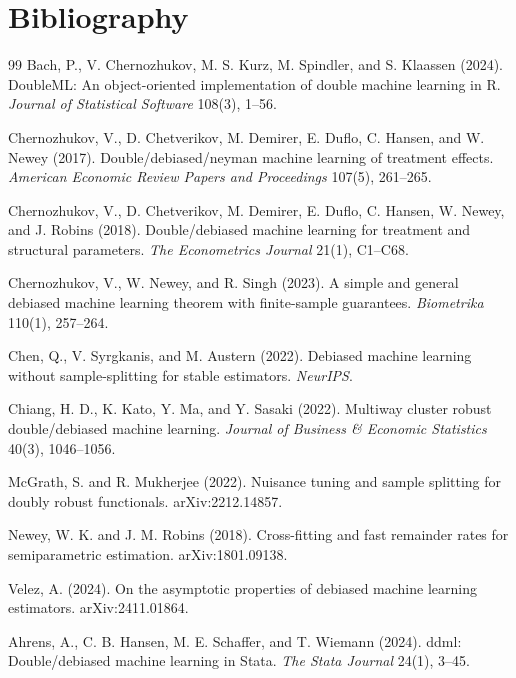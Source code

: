 \documentclass[11pt]{article}
\theoremstyle{definition}
\theoremstyle{plain}
\theoremstyle{remark}
\begin{document}
\section*{Bibliography}
\begin{thebibliography}{99}
Bach, P., V. Chernozhukov, M. S. Kurz, M. Spindler, and S. Klaassen (2024).
\newblock DoubleML: An object-oriented implementation of double machine learning in R.
\newblock \emph{Journal of Statistical Software} 108(3), 1--56.

Chernozhukov, V., D. Chetverikov, M. Demirer, E. Duflo, C. Hansen, and W. Newey (2017).
\newblock Double/debiased/neyman machine learning of treatment effects.
\newblock \emph{American Economic Review Papers and Proceedings} 107(5), 261--265.

Chernozhukov, V., D. Chetverikov, M. Demirer, E. Duflo, C. Hansen, W. Newey, and J. Robins (2018).
\newblock Double/debiased machine learning for treatment and structural parameters.
\newblock \emph{The Econometrics Journal} 21(1), C1--C68.

Chernozhukov, V., W. Newey, and R. Singh (2023).
\newblock A simple and general debiased machine learning theorem with finite-sample guarantees.
\newblock \emph{Biometrika} 110(1), 257--264.

Chen, Q., V. Syrgkanis, and M. Austern (2022).
\newblock Debiased machine learning without sample-splitting for stable estimators.
\newblock \emph{NeurIPS}.

Chiang, H. D., K. Kato, Y. Ma, and Y. Sasaki (2022).
\newblock Multiway cluster robust double/debiased machine learning.
\newblock \emph{Journal of Business \& Economic Statistics} 40(3), 1046--1056.

McGrath, S. and R. Mukherjee (2022).
\newblock Nuisance tuning and sample splitting for doubly robust functionals.
\newblock arXiv:2212.14857.

Newey, W. K. and J. M. Robins (2018).
\newblock Cross-fitting and fast remainder rates for semiparametric estimation.
\newblock arXiv:1801.09138.

Velez, A. (2024).
\newblock On the asymptotic properties of debiased machine learning estimators.
\newblock arXiv:2411.01864.

Ahrens, A., C. B. Hansen, M. E. Schaffer, and T. Wiemann (2024).
\newblock ddml: Double/debiased machine learning in Stata.
\newblock \emph{The Stata Journal} 24(1), 3--45.
\end{thebibliography}
\end{document}
